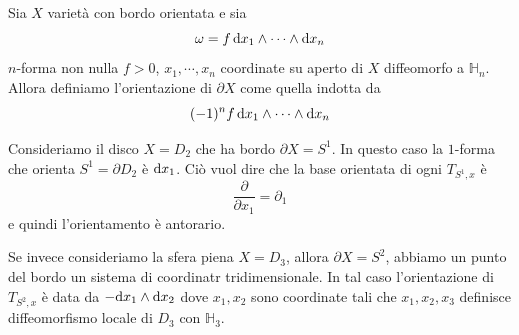 \documentclass[a4paper]{article}
\begin{document}
\begin{snippetdefinition}{}
    Sia \(X\) varietà con bordo orientata e sia \[
        \omega = f\,\text dx_1 \wedge\cdots\wedge\text dx_n
    \]
    \(n\)-forma non nulla \(f>0\), \(x_1, \cdots, x_n\)
    coordinate su aperto di \(X\) diffeomorfo a \(\mathbb H_n\).
    Allora definiamo l'orientazione di \(\partial X\) come quella indotta da
    \[
        (-1)^n f\,\text dx_1 \wedge\cdots\wedge\text dx_n
    \]
\end{snippetdefinition}

\begin{snippetexample}{}
    Consideriamo il disco \(X = D_2\) che ha bordo \(\partial X = S^1\).
    In questo caso la \(1\)-forma che orienta \(S^1 = \partial D_2\) è \(\text dx_1\).
    Ciò vuol dire che la base orientata di ogni \(T_{S^1, x}\) è \[
        \frac{\partial}{\partial x_1} = \partial_1
    \]
    e quindi l'orientamento è antorario.
    \begin{center}
    \end{center}
    Se invece consideriamo la sfera piena \(X = D_3\), allora \(\partial X = S^2\),
    abbiamo un punto del bordo un sistema di coordinatr tridimensionale.
    In tal caso l'orientazione di \(T_{S^2, x}\) è data da
    \(-\text dx_1 \wedge \text dx_2\) dove \(x_1, x_2\) sono coordinate tali che
    \(x_1, x_2, x_3\) definisce diffeomorfismo locale di \(D_3\) con \(\mathbb H_3\).
    \begin{center}
\end{center}
\end{snippetexample}
\end{document}
